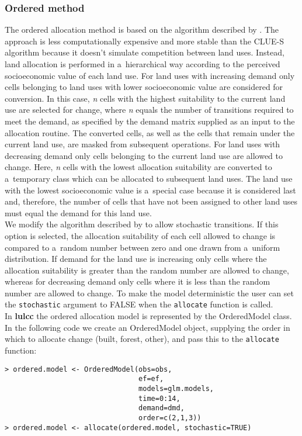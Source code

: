 \documentclass{icldt}\usepackage[]{graphicx}\usepackage[]{color}
\begin{document}
\subsubsection{Ordered method}

The ordered allocation method is based on the algorithm described by \citet{fuchs2013}. The approach is less computationally expensive and more stable than the CLUE-S algorithm because it doesn't simulate competition between land uses. Instead, land allocation is performed in a~hierarchical way according to the perceived socioeconomic value of each land use. For land uses with increasing demand only cells belonging to land uses with lower socioeconomic value are considered for conversion. In this case, \textit{n} cells with the highest suitability to the current land use are selected for change, where \textit{n} equals the number of transitions required to meet the demand, as specified by the demand matrix supplied as an input to the allocation routine. The converted cells, as well as the cells that remain under the current land use, are masked from subsequent operations. For land uses with decreasing demand only cells belonging to the current land use are allowed to change. Here, \textit{n} cells with the lowest allocation suitability are converted to a~temporary class which can be allocated to subsequent land uses. The land use with the lowest socioeconomic value is a~special case because it is considered last and, therefore, the number of cells that have not been assigned to other land uses must equal the demand for this land use. \\

We modify the algorithm described by \citep{fuchs2013} to allow stochastic transitions. If this option is selected, the allocation suitability of each cell allowed to change is compared to a~random number between zero and one drawn from a~uniform distribution. If demand for the land use is increasing only cells where the allocation suitability is greater than the random number are allowed to change, whereas for decreasing demand only cells where it is less than the random number are allowed to change. To make the model deterministic the user can set the \texttt{stochastic} argument to FALSE when the \texttt{allocate} function is called. \\

In \textbf{lulcc} the ordered allocation model is represented by the OrderedModel class. In the following code we create an OrderedModel object, supplying the order in which to allocate change (built, forest, other), and pass this to the \texttt{allocate} function:
\begin{verbatim}
> ordered.model <- OrderedModel(obs=obs, 
                                ef=ef, 
                                models=glm.models, 
                                time=0:14, 
                                demand=dmd, 
                                order=c(2,1,3)) 
> ordered.model <- allocate(ordered.model, stochastic=TRUE)
\end{verbatim}
\end{document}
